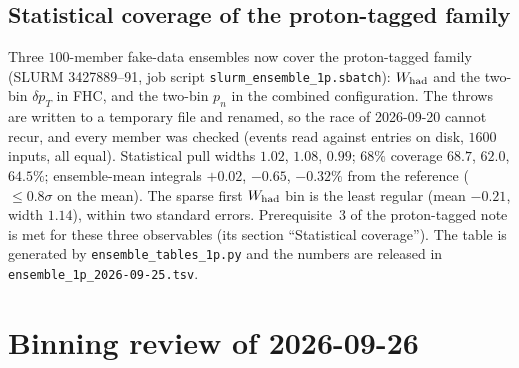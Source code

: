 \subsection{Statistical coverage of the proton-tagged family}
Three $100$-member fake-data ensembles now cover the proton-tagged family
(SLURM 3427889--91, job script \texttt{slurm\_ensemble\_1p.sbatch}): $W_{\rm had}$ and the two-bin
$\delta p_T$ in FHC, and the two-bin $p_n$ in the combined configuration. The throws are written to
a temporary file and renamed, so the race of 2026-09-20 cannot recur, and every member was checked
(events read against entries on disk, $1600$ inputs, all equal). Statistical pull widths
$1.02$, $1.08$, $0.99$; $68\%$ coverage $68.7$, $62.0$, $64.5\%$; ensemble-mean integrals
$+0.02$, $-0.65$, $-0.32\%$ from the reference ($\le0.8\sigma$ on the mean). The sparse first
$W_{\rm had}$ bin is the least regular (mean $-0.21$, width $1.14$), within two standard errors.
Prerequisite~3 of the proton-tagged note is met for these three observables
(its section ``Statistical coverage''). The table is generated by
\texttt{ensemble\_tables\_1p.py} and the numbers are released in
\texttt{ensemble\_1p\_2026-09-25.tsv}.

\section{Binning review of 2026-09-26}

